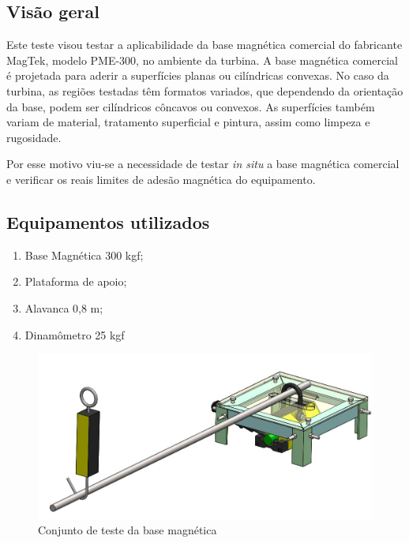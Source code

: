 \subsection{Visão geral}
Este teste visou testar a aplicabilidade da base magnética comercial do
fabricante MagTek, modelo PME-300, no ambiente da turbina. A base magnética
comercial é projetada para aderir a superfícies planas ou cilíndricas convexas.
No caso da turbina, as regiões testadas têm formatos variados, que dependendo da
orientação da base, podem ser cilíndricos côncavos ou convexos. As
superfícies também variam de material, tratamento superficial e pintura,
assim como limpeza e rugosidade.

Por esse motivo viu-se a necessidade de testar
\textit{in situ} a base magnética comercial e verificar os reais limites de
adesão magnética do equipamento.


\subsection{Equipamentos utilizados}
\begin{enumerate}
  \item Base Magnética 300 kgf;
  \item Plataforma de apoio;
  \item Alavanca 0,8 m;
  \item Dinamômetro 25 kgf
\end{enumerate} 

\begin{figure}[h!]
\centering
	\includegraphics[width=0.9\columnwidth]{figs/conjunto_01.jpg}
	\caption{Conjunto de teste da base magnética}
	\label{fig::conjunto}
\end{figure}

\newpage
